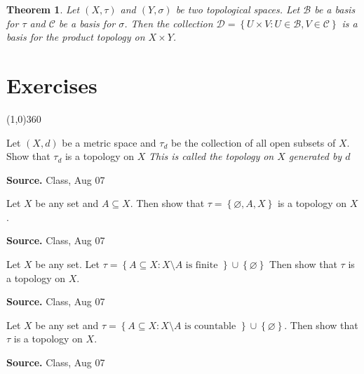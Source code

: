 \documentclass[12pt,twoside]{report}
\newtheorem{thm}{Theorem}
\newenvironment*{source}{\hfill\scriptsize\textbf{Source.}\space}{\par}
\begin{document}
\begin{thm}
    Let $\left (X, \tau\right )$ and $\left (Y, \sigma\right )$ be two topological spaces. Let $\mathcal{B}$ be a basis for $\tau$ and $\mathcal{C}$ be a basis for $\sigma$.
    Then the collection $\mathcal{D} = \left\{ U \times V  :  U \in \mathcal{B}, V \in \mathcal{C} \right\}$ is a basis for the product topology on $X \times Y$.
\end{thm}

\chapter{Exercises}
\line(1,0){360}

\begin{samepage}
\begin{ex}
Let $\left (X, d\right )$ be a metric space and $\tau_d$ be the collection of all open subsets of $X$. 
Show that $\tau_d$ is a topology on $X$
\vspace{0.5cm}
\textit{This is called the topology on $X$ generated by $d$}
\end{ex}
\begin{source}
Class, Aug 07
\end{source}
\end{samepage}

\begin{samepage}
\begin{ex}
Let $X$ be any set and $A \subseteq X$. Then show that 
$\tau = \left\{ \varnothing, A , X \right\}$ is a topology on $X$.
\end{ex}
\begin{source}
Class, Aug 07
\end{source}
\end{samepage}

\begin{samepage}
\begin{ex}
Let $X$ be any set. Let 
$\tau = \left\{ A \subseteq X  :  X \setminus A \text{ is finite } \right\} \cup \left\{ \varnothing \right\} $
Then show that $\tau$ is a topology on $X$.
\end{ex}
\begin{source}
Class, Aug 07
\end{source}
\end{samepage}

\begin{samepage}
\begin{ex}
Let $X$ be any set and 
$\tau = \left\{ A \subseteq X  :  X \setminus A \text{ is countable } \right\} \cup \left\{ \varnothing \right\} $.
Then show that $\tau$ is a topology on $X$.
\end{ex}
\begin{source}
Class, Aug 07
\end{source}
\end{samepage}
\end{document}
